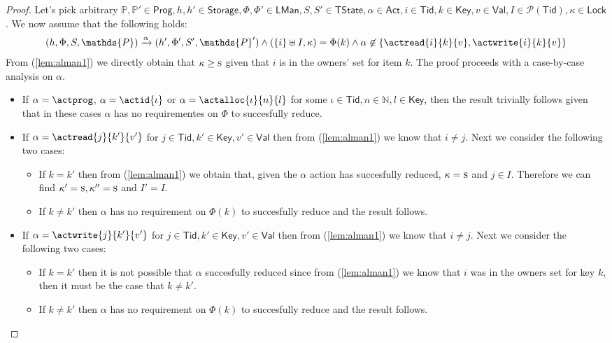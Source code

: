 \begin{proof}
Let's pick arbitrary $\mathds{P}, \mathds{P}' \in \mathsf{Prog}, h, h' \in \mathsf{Storage}, \Phi, \Phi' \in \mathsf{LMan}, S, S' \in \mathsf{TState}, \alpha \in \mathsf{Act}, i \in \mathsf{Tid}, k \in \mathsf{Key}, v \in \mathsf{Val}, I \in \mathcal{P}(\mathsf{Tid}), \kappa \in \mathsf{Lock}$. We now assume that the following holds:
\begin{gather}
	\label{lem:alman1}
	(h, \Phi, S, \mathds{P}) \xrightarrow{\alpha} (h', \Phi', S', \mathds{P}')
		\land
	(\{i\} \uplus I, \kappa) = \Phi(k)
		\land
	\alpha \not\in \{ \actread{i}{k}{v}, \actwrite{i}{k}{v} \}
\end{gather}
From (\ref{lem:alman1}) we directly obtain that $\kappa \geq \textsc{s}$ given that $i$ is in the owners' set for item $k$. The proof proceeds with a case-by-case analysis on $\alpha$.
\begin{itemize}
	\item If $\alpha = \actprog$, $\alpha = \actid{\iota}$ or $\alpha = \actalloc{\iota}{n}{l}$ for some $\iota \in \mathsf{Tid}, n \in \mathds{N}, l \in \mathsf{Key}$, then the result trivially follows given that in these cases $\alpha$ has no requirementes on $\Phi$ to succesfully reduce.
	
	\item If $\alpha = \actread{j}{k'}{v'}$ for $j \in \mathsf{Tid}, k' \in \mathsf{Key}, v' \in \mathsf{Val}$ then from (\ref{lem:alman1}) we know that $i \neq j$. Next we consider the following two cases:
		\begin{itemize}
			\item If $k = k'$ then from (\ref{lem:alman1}) we obtain that, given the $\alpha$ action has succesfully reduced, $\kappa = \textsc{s}$ and $j \in I$. Therefore we can find $\kappa' = \textsc{s}, \kappa'' = \textsc{s}$ and $I' = I$.
			\item If $k \neq k'$ then $\alpha$ has no requirement on $\Phi(k)$ to succesfully reduce and the result follows.
		\end{itemize}
		
	\item If $\alpha = \actwrite{j}{k'}{v'}$ for $j \in \mathsf{Tid}, k' \in \mathsf{Key}, v' \in \mathsf{Val}$ then from (\ref{lem:alman1}) we know that $i \neq j$. Next we consider the following two cases:
		\begin{itemize}
			\item If $k = k'$ then it is not possible that $\alpha$ succesfully reduced since from (\ref{lem:alman1}) we know that $i$ was in the owners set for key $k$, then it must be the case that $k \neq k'$.
			\item If $k \neq k'$ then $\alpha$ has no requirement on $\Phi(k)$ to succesfully reduce and the result follows.
		\end{itemize}
		

\end{itemize}
\end{proof}
